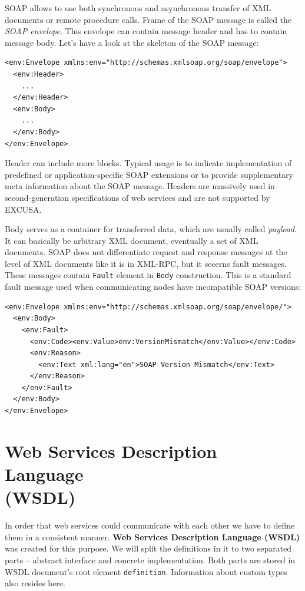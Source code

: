 \documentclass[12pt,notitlepage]{report}
\begin{document}
SOAP allows to use both synchronous and asynchronous transfer of XML documents or remote procedure calls\cite{w3c-soap0}. Frame of the SOAP message is called the \textit{SOAP envelope}. This envelope can contain message header and has to contain message body\cite{w3c-soap1}. Let's have a look at the skeleton of the SOAP message:

\begin{small}
\begin{verbatim}
<env:Envelope xmlns:env="http://schemas.xmlsoap.org/soap/envelope">
  <env:Header>
    ...
  </env:Header>
  <env:Body>
    ...
  </env:Body>
</env:Envelope>
\end{verbatim}
\end{small}

Header can include more blocks. Typical usage is to indicate implementation of predefined or application-specific SOAP extensions or to provide supplementary meta information about the SOAP message. Headers are massively used in second-generation specifications of web services and are not supported by EXCUSA.

Body serves as a container for transferred data, which are usually called \textit{payload}. It can basically be arbitrary XML document, eventually a set of XML documents. SOAP does not differentiate request and response messages at the level of XML documents like it is in XML-RPC, but it secerns fault messages. These messages contain \texttt{Fault} element in \texttt{Body} construction. This is a standard fault message used when communicating nodes have incompatible SOAP versions:

\begin{small}
\begin{verbatim}
<env:Envelope xmlns:env="http://schemas.xmlsoap.org/soap/envelope/">
  <env:Body>
    <env:Fault>
      <env:Code><env:Value>env:VersionMismatch</env:Value></env:Code>
      <env:Reason>
        <env:Text xml:lang="en">SOAP Version Mismatch</env:Text>
      </env:Reason>
    </env:Fault>
  </env:Body>
</env:Envelope>
\end{verbatim}
\end{small}

\section{Web Services Description Language\\(WSDL)}

In order that web services could communicate with each other we have to define them in a consistent manner. \textbf{Web Services Description Language (WSDL)} was created for this purpose. We will split the definitions in it to two separated parts -- abstract interface and concrete implementation\cite{erl}. Both parts are stored in WSDL document's root element \texttt{definition}. Information about custom types also resides here.
\end{document}
